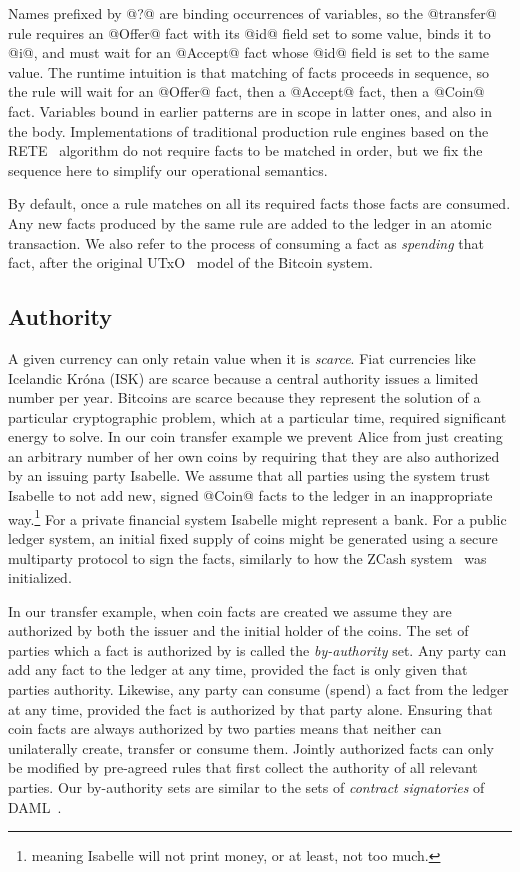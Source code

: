 Names prefixed by @?@ are binding occurrences of variables, so the @transfer@ rule requires an @Offer@ fact with its @id@ field set to some value, binds it to @i@, and must wait for an @Accept@ fact whose @id@ field is set to the same value. The runtime intuition is that matching of facts proceeds in sequence, so the rule will wait for an @Offer@ fact, then a @Accept@ fact, then a @Coin@ fact. Variables bound in earlier patterns are in scope in latter ones, and also in the body. Implementations of traditional production rule engines based on the RETE~\cite{Forgy1981:RETE} algorithm do not require facts to be matched in order, but we fix the sequence here to simplify our operational semantics.

By default, once a rule matches on all its required facts those facts are consumed. Any new facts produced by the same rule are added to the ledger in an atomic transaction. We also refer to the process of consuming a fact as \emph{spending} that fact, after the original UTxO~\cite{Zahnentferner2018:UTxO} model of the Bitcoin system.


\subsection{Authority}
\label{s:FactAuthority}
A given currency can only retain value when it is \emph{scarce}. Fiat currencies like Icelandic Kr\'ona (ISK) are scarce because a central authority issues a limited number per year. Bitcoins are scarce because they represent the solution of a particular cryptographic problem, which at a particular time, required significant energy to solve. In our coin transfer example we prevent Alice from just creating an arbitrary number of her own coins by requiring that they are also authorized by an issuing party Isabelle. We assume that all parties using the system trust Isabelle to not add new, signed @Coin@ facts to the ledger in an inappropriate way.\footnote{meaning Isabelle will not print money, or at least, not too much.} For a private financial system Isabelle might represent a bank. For a public ledger system, an initial fixed supply of coins might be generated using a secure multiparty protocol to sign the facts, similarly to how the ZCash system~\cite{Bowe2018:MultiParty, Hopwood2016:zcash} was initialized.

\eject{}
In our transfer example, when coin facts are created we assume they are authorized by both the issuer and the initial holder of the coins. The set of parties which a fact is authorized by is called the \emph{by-authority} set. Any party can add any fact to the ledger at any time, provided the fact is only given that parties authority. Likewise, any party can consume (spend) a fact from the ledger at any time, provided the fact is authorized by that party alone. Ensuring that coin facts are always authorized by two parties means that neither can unilaterally create, transfer or consume them. Jointly authorized facts can only be modified by pre-agreed rules that first collect the authority of all relevant parties. Our by-authority sets are similar to the sets of \emph{contract signatories} of DAML~\cite{DA2019:DAML}.

